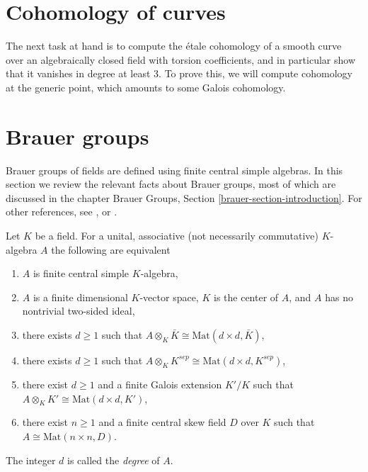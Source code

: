 







\section{Cohomology of curves}
\label{section-cohomology-curves}

\noindent
The next task at hand is to compute the \'etale cohomology of a smooth curve
over an algebraically closed field with torsion coefficients, and in
particular show that it vanishes in degree at least 3. To prove this, we
will compute cohomology at the generic point, which
amounts to some Galois cohomology.





\section{Brauer groups}
\label{section-brauer-groups}

\noindent
Brauer groups of fields are defined using finite central simple algebras.
In this section we review the relevant facts about Brauer groups, most of
which are discussed in the chapter
Brauer Groups, Section \ref{brauer-section-introduction}.
For other references, see \cite{SerreCorpsLocaux},
\cite{SerreGaloisCohomology} or \cite{Weil}.

\begin{theorem}
\label{theorem-central-simple-algebra}
Let $K$ be a field. For a unital, associative (not necessarily commutative)
$K$-algebra $A$ the following are equivalent
\begin{enumerate}
\item $A$ is finite central simple $K$-algebra,
\item $A$ is a finite dimensional $K$-vector space, $K$ is the center of $A$,
and $A$ has no nontrivial two-sided ideal,
\item there exists $d \geq 1$ such that
$A \otimes_K \bar K \cong \text{Mat}(d \times d, \bar K)$,
\item there exists $d \geq 1$ such that
$A \otimes_K K^{sep} \cong \text{Mat}(d \times d, K^{sep})$,
\item there exist $d \geq 1$ and a finite Galois extension $K'/K$
such that
$A \otimes_K K' \cong \text{Mat}(d \times d, K')$,
\item there exist $n \geq 1$ and a finite central skew field $D$
over $K$ such that $A \cong \text{Mat}(n \times n, D)$.
\end{enumerate}
The integer $d$ is called the {\it degree} of $A$.
\end{theorem}

